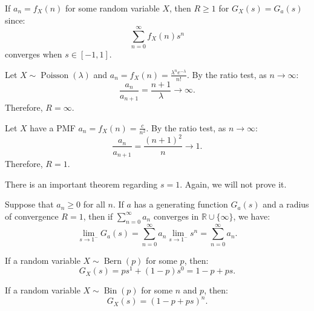 \documentclass{huhtakm-template-book-v2}
\DeclareMathOperator{\Bern}{Bern}
\DeclareMathOperator{\Bin}{Bin}
\DeclareMathOperator{\Poisson}{Poisson}
\begin{document}
    \begin{rem}
        If $a_{n} = f_{X}(n)$ for some random variable $X$, then $R \geq 1$ for $G_{X}(s) = G_{a}(s)$ since:
        \begin{equation*}
            \sum_{n = 0}^{\infty}f_{X}(n)s^{n}
        \end{equation*}
        converges when $s \in [-1,1]$.
    \end{rem}
    \begin{eg}
        Let $X \sim \Poisson(\lambda)$ and $a_{n} = f_{X}(n) = \frac{\lambda^{n}e^{-\lambda}}{n!}$. By the ratio test, as $n \to \infty$:
        \begin{equation*}
            \frac{a_{n}}{a_{n+1}} = \frac{n+1}{\lambda} \to \infty.
        \end{equation*}
        Therefore, $R = \infty$.
    \end{eg}
    \begin{eg}
        Let $X$ have a PMF $a_{n} = f_{X}(n) = \frac{c}{n^{2}}$. By the ratio test, as $n \to \infty$:
        \begin{equation*}
            \frac{a_{n}}{a_{n+1}} = \frac{(n+1)^{2}}{n} \to 1.
        \end{equation*}
        Therefore, $R = 1$.
    \end{eg}
    There is an important theorem regarding $s = 1$. Again, we will not prove it.
    \begin{thm}
        Suppose that $a_{n} \geq 0$ for all $n$. If $a$ has a generating function $G_{a}(s)$ and a radius of convergence $R = 1$, then if $\sum_{n = 0}^{\infty}a_{n}$ converges in $\mathbb{R}\cup\{\infty\}$, we have:
        \begin{equation*}
            \lim_{s \to 1^{-}}G_{a}(s) = \sum_{n = 0}^{\infty}a_{n}\lim_{s \to 1^{-}}s^{n} = \sum_{n = 0}^{\infty}a_{n}.
        \end{equation*}
    \end{thm}
    \begin{eg}
        If a random variable $X \sim \Bern(p)$ for some $p$, then:
        \begin{equation*}
            G_{X}(s) = ps^{1}+(1-p)s^{0} = 1-p+ps.
        \end{equation*}
    \end{eg}
    \begin{eg}
        If a random variable $X \sim \Bin(p)$ for some $n$ and $p$, then:
        \begin{equation*}
            G_{X}(s) = (1-p+ps)^{n}.
        \end{equation*}
    \end{eg}
\end{document}
